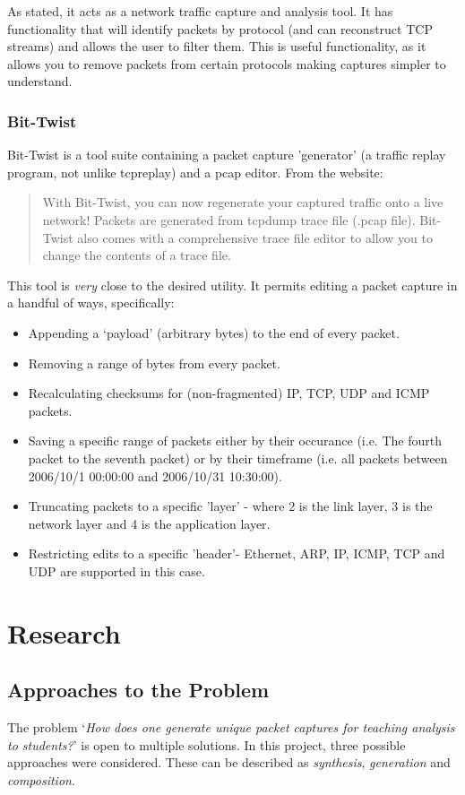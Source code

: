 \documentclass[10pt,a4paper,notitlepage]{report}
\begin{document}
As stated, it acts as a network traffic capture and analysis tool. It has functionality that will identify packets by protocol (and can reconstruct TCP streams) and allows the user to filter them. This is useful functionality, as it allows you to remove packets from certain protocols making captures simpler to understand.

\subsection{Bit-Twist}
Bit-Twist is a tool suite containing a packet capture 'generator' (a traffic replay program, not unlike tcpreplay\cite{tcpreplay-web}) and a pcap editor.
From the website\cite{bittwist-web}:

\begin{quote}
With Bit-Twist, you can now regenerate your captured traffic onto a live network! Packets are generated from tcpdump trace file (.pcap file). Bit-Twist also comes with a comprehensive trace file editor to allow you to change the contents of a trace file.
\end{quote}

This tool is \emph{very} close to the desired utility. It permits editing a packet capture in a handful of ways, specifically:
\begin{itemize}
\item Appending a `payload' (arbitrary bytes) to the end of every packet.
\item Removing a range of bytes from every packet.
\item Recalculating checksums for (non-fragmented) IP, TCP, UDP and ICMP packets.
\item Saving a specific range of packets either by their occurance (i.e. The fourth packet to the seventh packet) or by their timeframe (i.e. all packets between 2006/10/1 00:00:00 and 2006/10/31 10:30:00).
\item Truncating packets to a specific 'layer' - where 2 is the link layer, 3 is the network layer and 4 is the application layer.
\item Restricting edits to a specific 'header'- Ethernet, ARP, IP, ICMP, TCP and UDP are supported in this case.
\end{itemize}

\chapter{Research}
\section{Approaches to the Problem}
The problem `\emph{How does one generate unique packet captures for teaching analysis to students?}' is open to multiple solutions. In this project, three possible approaches were considered. These can be described as \emph{synthesis}, \emph{generation} and \emph{composition}.
\end{document}

